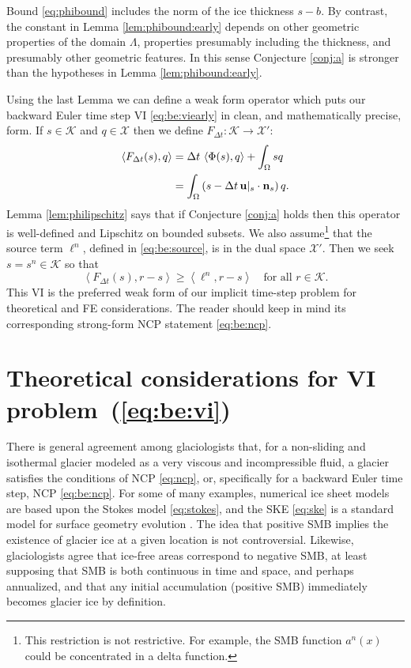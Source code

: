 \documentclass[hidelinks,onefignum,onetabnum,final]{siamart220329}  %
\newcommand{\bn}{\mathbf{n}}
\newcommand{\bu}{\mathbf{u}}
\newcommand{\cK}{\mathcal{K}}
\newcommand{\cX}{\mathcal{X}}
\newcommand{\ip}[2]{\left<#1,#2\right>}
\begin{document}
Bound \eqref{eq:phibound} includes the norm of the ice thickness $s-b$.  By contrast, the constant in Lemma \ref{lem:phibound:early} depends on other geometric properties of the domain $\Lambda$, properties presumably including the thickness, and presumably other geometric features.  In this sense Conjecture \ref{conj:a} is stronger than the hypotheses in Lemma \ref{lem:phibound:early}.

Using the last Lemma we can define a weak form operator which puts our backward Euler time step VI \eqref{eq:be:viearly} in clean, and mathematically precise, form.  If $s\in\cK$ and $q\in\cX$ then we define $F_{\Delta t}:\cK\to\cX'$:
\begin{align}
\ip{F_{\Delta t}(s)}{q} &= \Delta t\,\ip{\Phi(s)}{q} + \int_\Omega s q \label{eq:be:Fdefine}\\
    &= \int_\Omega \left(s - \Delta t\, \bu|_s \cdot \bn_s\right) q. \notag
\end{align}
Lemma \ref{lem:philipschitz} says that if Conjecture \ref{conj:a} holds then this operator is well-defined and Lipschitz on bounded subsets.  We also assume\footnote{This restriction is not restrictive.  For example, the SMB function $a^n(x)$ could be concentrated in a delta function.} that the source term $\ell^n$, defined in \eqref{eq:be:source}, is in the dual space $\cX'$.  Then we seek $s = s^n \in \cK$ so that
\begin{equation}
\ip{F_{\Delta t}(s)}{r-s} \ge \ip{\ell^n}{r-s} \quad \text{for all } r \in \cK. \label{eq:be:vi}
\end{equation}
This VI is the preferred weak form of our implicit time-step problem for theoretical and FE considerations.  The reader should keep in mind its corresponding strong-form NCP statement \eqref{eq:be:ncp}.


\section{Theoretical considerations for VI problem~(\ref{eq:be:vi})} \label{sec:theory}

There is general agreement among glaciologists that, for a non-sliding and isothermal glacier modeled as a very viscous and incompressible fluid, a glacier satisfies the conditions of NCP \eqref{eq:ncp}, or, specifically for a backward Euler time step, NCP \eqref{eq:be:ncp}.  For some of many examples, numerical ice sheet models \cite{IsaacStadlerGhattas2015,WirbelJarosch2020} are based upon the Stokes model \eqref{eq:stokes}, and the SKE \eqref{eq:ske} is a standard model for surface geometry evolution \cite{GreveBlatter2009,SchoofHewitt2013}.  The idea that positive SMB implies the existence of glacier ice at a given location is not controversial.  Likewise, glaciologists agree that ice-free areas correspond to negative SMB, at least supposing that SMB is both continuous in time and space, and perhaps annualized, and that any initial accumulation (positive SMB) immediately becomes glacier ice by definition.
\end{document}
